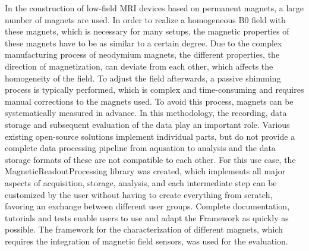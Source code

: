In the construction of low-field MRI devices based on permanent magnets,
a large number of magnets are used. In order to realize a homogeneous B0
field with these magnets, which is necessary for many setups, the
magnetic properties of these magnets have to be as similar to a certain
degree. Due to the complex manufacturing process of neodymium magnets,
the different properties, the direction of magnetization, can deviate
from each other, which affects the homogeneity of the field. To adjust
the field afterwards, a passive shimming process is typically performed,
which is complex and time-consuming and requires manual corrections to
the magnets used. To avoid this process, magnets can be systematically
measured in advance. In this methodology, the recording, data storage
and subsequent evaluation of the data play an important role. Various
existing open-source solutions implement individual parts, but do not
provide a complete data processing pipeline from aqusation to analysis
and the data storage formats of these are not compatible to each other.
For this use case, the MagneticReadoutProcessing library was created,
which implements all major aspects of acquisition, storage, analysis,
and each intermediate step can be customized by the user without having
to create everything from scratch, favoring an exchange between
different user groups. Complete documentation, tutorials and tests
enable users to use and adapt the Framework as quickly as possible. The
framework for the characterization of different magnets, which requires
the integration of magnetic field sensors, was used for the evaluation.
